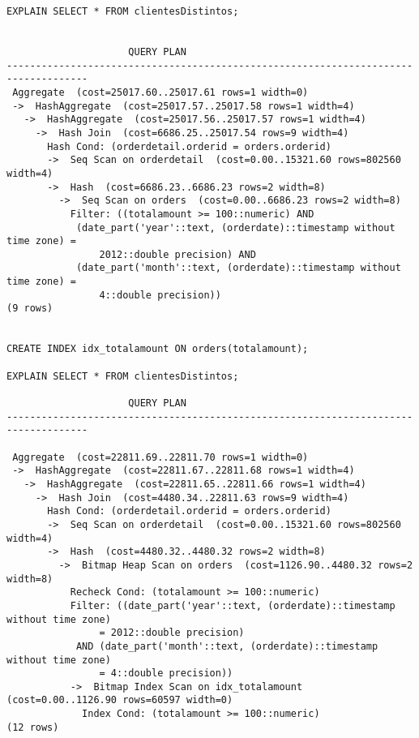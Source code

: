 \documentclass{article}
\begin{document}
\begin{Verbatim}
EXPLAIN SELECT * FROM clientesDistintos;


				     QUERY PLAN
------------------------------------------------------------------------------------
 Aggregate  (cost=25017.60..25017.61 rows=1 width=0)
 ->  HashAggregate  (cost=25017.57..25017.58 rows=1 width=4)
   ->  HashAggregate  (cost=25017.56..25017.57 rows=1 width=4)
     ->  Hash Join  (cost=6686.25..25017.54 rows=9 width=4)
       Hash Cond: (orderdetail.orderid = orders.orderid)
       ->  Seq Scan on orderdetail  (cost=0.00..15321.60 rows=802560 width=4)
       ->  Hash  (cost=6686.23..6686.23 rows=2 width=8)
         ->  Seq Scan on orders  (cost=0.00..6686.23 rows=2 width=8)
           Filter: ((totalamount >= 100::numeric) AND
           	(date_part('year'::text, (orderdate)::timestamp without time zone) =
           		2012::double precision) AND
           	(date_part('month'::text, (orderdate)::timestamp without time zone) =
           		4::double precision))
(9 rows)


CREATE INDEX idx_totalamount ON orders(totalamount);

EXPLAIN SELECT * FROM clientesDistintos;

    				 QUERY PLAN
------------------------------------------------------------------------------------

 Aggregate  (cost=22811.69..22811.70 rows=1 width=0)
 ->  HashAggregate  (cost=22811.67..22811.68 rows=1 width=4)
   ->  HashAggregate  (cost=22811.65..22811.66 rows=1 width=4)
     ->  Hash Join  (cost=4480.34..22811.63 rows=9 width=4)
       Hash Cond: (orderdetail.orderid = orders.orderid)
       ->  Seq Scan on orderdetail  (cost=0.00..15321.60 rows=802560 width=4)
       ->  Hash  (cost=4480.32..4480.32 rows=2 width=8)
         ->  Bitmap Heap Scan on orders  (cost=1126.90..4480.32 rows=2 width=8)
           Recheck Cond: (totalamount >= 100::numeric)
           Filter: ((date_part('year'::text, (orderdate)::timestamp without time zone)
           		= 2012::double precision)
           	AND (date_part('month'::text, (orderdate)::timestamp without time zone)
           		= 4::double precision))
           ->  Bitmap Index Scan on idx_totalamount  (cost=0.00..1126.90 rows=60597 width=0)
             Index Cond: (totalamount >= 100::numeric)
(12 rows)



\end{Verbatim}
\end{document}
